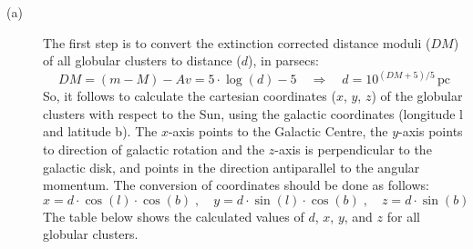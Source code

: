 \begin{description}
\item[(a)] The first step is to convert the extinction corrected distance
  moduli ($DM$) of all globular clusters to distance ($d$), in parsecs:
  \[
    DM = (m - M) - Av = 5\cdot\log(d) - 5
    \quad\Rightarrow\quad
    d = 10^{(DM+5)/5}\,\mathrm{pc}
  \]
  So, it follows to calculate the cartesian coordinates ($x$, $y$, $z$) of the
  globular clusters with respect to the Sun, using the galactic coordinates
  (longitude l and latitude b). The $x$-axis points to the Galactic Centre,
  the $y$-axis points to direction of galactic rotation and the $z$-axis is
  perpendicular to the galactic disk, and points in the direction antiparallel
  to the angular momentum. The conversion of coordinates should be done as
  follows:
  \[
    x = d\cdot\cos(l)\cdot\cos(b)\;,\quad
    y = d\cdot\sin(l)\cdot\cos(b)\;,\quad
    z = d\cdot\sin(b)
  \]
  The table below shows the calculated values of $d$, $x$, $y$, and $z$ for
  all globular clusters.


\end{description}
